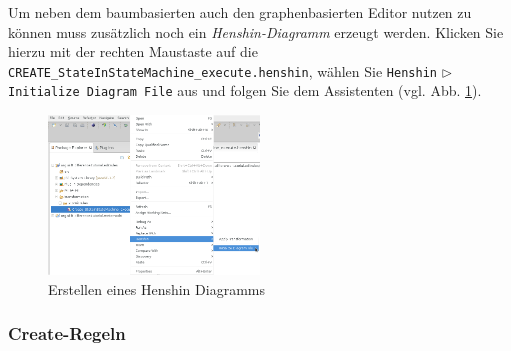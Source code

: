 \documentclass[a4paper]{scrartcl}
\begin{document}
Um neben dem baumbasierten auch den graphenbasierten Editor nutzen zu können muss zusätzlich noch ein \textit{Henshin-Diagramm} erzeugt werden.
Klicken Sie hierzu mit der rechten Maustaste auf die \texttt{CREATE\_StateInStateMachine\_execute.henshin}, wählen Sie \texttt{Henshin} $\triangleright$ \texttt{Initialize Diagram File} aus und folgen Sie dem Assistenten (vgl. Abb. \ref{silift-initialize_henshin_diagram}).

\begin{figure}[H]
\centering
\includegraphics[width=0.5\textwidth]{graphics/silift-initialize_henshin_diagram.png}
\caption{Erstellen eines Henshin Diagramms}
\label{silift-initialize_henshin_diagram}
\end{figure}




\subsubsection*{Create-Regeln}
\end{document}
